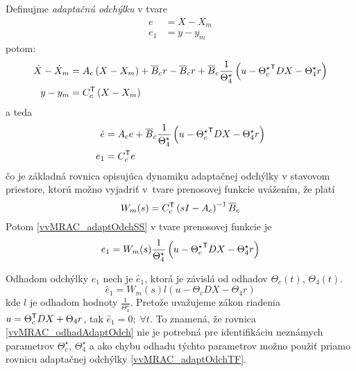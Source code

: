 \documentclass[a4paper, 10pt, ]{article}
\begin{document}
Definujme \emph{adaptačnú odchýlku} v tvare
\begin{align}
	e &=  X -  X_m \\
	e_1 & = y - y_m
\end{align}
potom:
\begin{subequations} \label{vvMRAC_adaptOdchmedzi}
	\begin{align}
		\dot X - \dot X_m &= A_c \left( X -  X_m \right) + \overline{B}_c r - \overline{B}_c r + \overline{B}_c \frac{1}{\Theta_4^\star} \left( u - {\Theta_c^\star}^{\mathsf{T}} D   X - \Theta_4^\star  r \right) \\
		y - y_m &= C_c^{\mathsf{T}} \left(  X - X_m \right)
	\end{align}
\end{subequations}
a teda
\begin{subequations}
\label{vvMRAC_adaptOdchSS}
	\begin{align}
		\dot{e} &= A_c e + \overline{B}_c \frac{1}{\Theta_4^\star} \left( u - {\Theta_c^\star}^{\mathsf{T}} D   X - \Theta_4^\star r \right) \\
		e_1  &= C_c^{\mathsf{T}} e
	\end{align}
\end{subequations}
čo je základná rovnica opisujúca dynamiku adaptačnej odchýlky v stavovom priestore, ktorú možno vyjadriť v~tvare prenosovej funkcie uvážením, že platí
\begin{equation}
	W_m(s) = C_c^{\mathsf{T}} \left( s I - A_c \right)^{-1} \overline{B}_c
\end{equation}
Potom \eqref{vvMRAC_adaptOdchSS} v tvare prenosovej funkcie je
\begin{equation} \label{vvMRAC_adaptOdchTF}
	e_1 = W_m(s)  \frac{1}{\Theta_4^\star} \left( u - {\Theta_c^\star}^{\mathsf{T}} D  X - \Theta_4^\star r \right)
\end{equation}

Odhadom odchýlky $e_1$ nech je $\hat{e}_1$, ktorá je závislá od odhadov $\Theta_c(t)$, $\Theta_4(t)$.
\begin{equation} \label{vvMRAC_odhadAdaptOdch}
	\hat{e}_1 = W_m(s)  l \left( u - \Theta_c D  X - \Theta_4 r \right)
\end{equation}
kde $l$ je odhadom hodnoty $\frac{1}{\Theta_4^\star}$. Pretože uvažujeme zákon riadenia $ u = \Theta_c^{\mathsf{T}} D X + \Theta_4 r $, tak $\hat{e}_1 = 0; \; \forall t$. To znamená, že rovnica \eqref{vvMRAC_odhadAdaptOdch} nie je potrebná pre identifikáciu neznámych parametrov $\Theta_c^\star$, $\Theta_4^\star$ a ako chybu odhadu týchto parametrov možno použiť priamo rovnicu adaptačnej odchýlky \eqref{vvMRAC_adaptOdchTF}.
\end{document}
